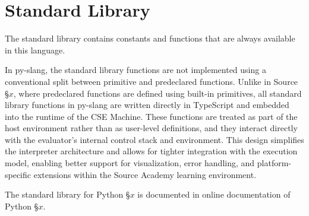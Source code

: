 \section{Standard Library}

The standard library contains constants and functions that are 
always available in this language. 

In py-slang, the standard library functions are not implemented 
using a conventional split between primitive and predeclared 
functions. Unlike in Source \S $x$, where predeclared functions are 
defined using built-in primitives, all standard library functions 
in py-slang are written directly in TypeScript and embedded into 
the runtime of the CSE Machine. These functions are treated as 
part of the host environment rather than as user-level definitions, 
and they interact directly with the evaluator's internal control 
stack and environment. This design simplifies the interpreter 
architecture and allows for tighter integration with the execution 
model, enabling better support for visualization, error handling, 
and platform-specific extensions within the Source Academy learning 
environment.

The standard library for Python \S $x$ is documented in online 
documentation of Python \S $x$.
